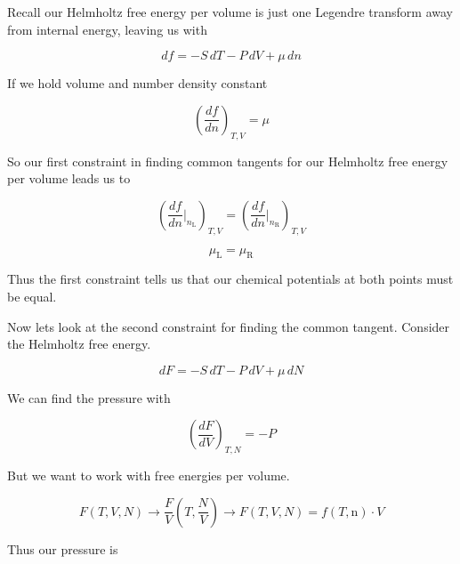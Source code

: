 Recall our Helmholtz free energy per volume is just one Legendre transform away from internal energy, leaving us with

\begin{equation}
df = - S \, dT - P \, dV + \mu \, dn
\end{equation}

If we hold volume and number density constant

\begin{equation}
\left( \frac{df}{dn} \right)_{T,V} = \mu
\end{equation}

So our first constraint in finding common tangents for our Helmholtz free energy per volume leads us to

\begin{equation}
\left( \frac{df}{dn}\Bigr|_{n_{\text{L}}} \right)_{T,V} = \left( \frac{df}{dn}\Bigr|_{n_{\text{R}}} \right)_{T,V}
\end{equation}

\begin{equation}
\mu_{\text{L}} = \mu_{\text{R}}
\end{equation}

Thus the first constraint tells us that our chemical potentials at both points must be equal.


Now lets look at the second constraint for finding the common tangent.  Consider the Helmholtz free energy.

\begin{equation}
dF = - S \, dT - P \, dV + \mu \, dN 
\end{equation}

We can find the pressure with

\begin{equation}
\left( \frac{dF}{dV} \right)_{T,N} = - P
\end{equation}

But we want to work with free energies per volume.

\begin{equation}
F(T,V,N)  \rightarrow \frac{F}{V}(T,\frac{N}{V}) \rightarrow F(T,V,N) = f(T,\text{n}) \cdot V
\end{equation}

Thus our pressure is


%
%
%
%

